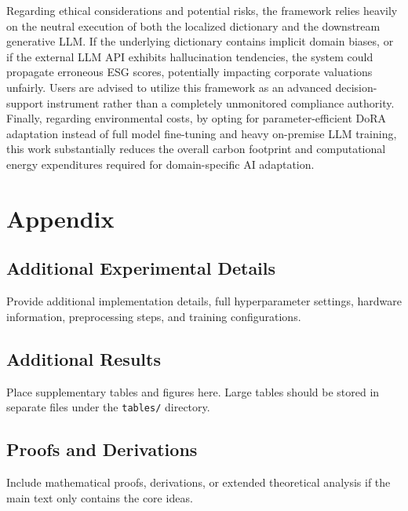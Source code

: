\documentclass{article}
\theoremstyle{plain}
\theoremstyle{definition}
\theoremstyle{remark}
\begin{document}
Regarding ethical considerations and potential risks, the framework relies heavily on the neutral execution of both the localized dictionary and the downstream generative LLM. If the underlying dictionary contains implicit domain biases, or if the external LLM API exhibits hallucination tendencies, the system could propagate erroneous ESG scores, potentially impacting corporate valuations unfairly. Users are advised to utilize this framework as an advanced decision-support instrument rather than a completely unmonitored compliance authority. Finally, regarding environmental costs, by opting for parameter-efficient DoRA adaptation instead of full model fine-tuning and heavy on-premise LLM training, this work substantially reduces the overall carbon footprint and computational energy expenditures required for domain-specific AI adaptation.



\newpage
\appendix
\onecolumn

\section{Appendix}
\label{sec:appendix}

\subsection{Additional Experimental Details}
Provide additional implementation details, full hyperparameter settings, hardware information, preprocessing steps, and training configurations.

\subsection{Additional Results}
Place supplementary tables and figures here. Large tables should be stored in separate files under the \texttt{tables/} directory.

\subsection{Proofs and Derivations}
Include mathematical proofs, derivations, or extended theoretical analysis if the main text only contains the core ideas.
\end{document}
